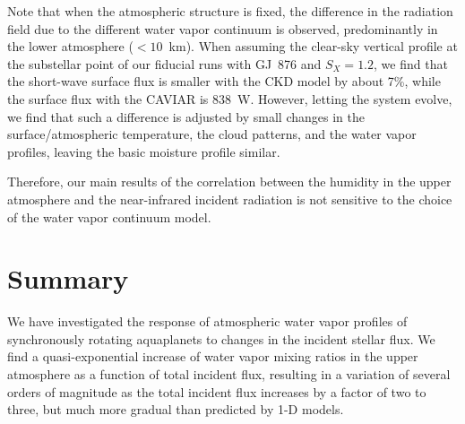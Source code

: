 \documentclass[11pt,numberedappendix,twocolappendix,]{emulateapj}
\def\wv{water vapor}
\begin{document}
{Note that when the atmospheric structure is fixed, the difference in the radiation field due to the different water vapor continuum is observed, predominantly in the lower atmosphere ($<10 $~km). 
When assuming the clear-sky vertical profile at the substellar point of our fiducial runs with GJ~876 and $S_X=1.2$, we find that the short-wave surface flux is smaller with the CKD model by about 7\%, while the surface flux with the CAVIAR is 838~W. 
However, letting the system evolve, we find that such a difference is  adjusted by small changes in the surface/atmospheric temperature, the cloud patterns, and the water vapor profiles, leaving the basic moisture profile  similar. 

Therefore, our main results of the correlation between the humidity in the upper atmosphere and the near-infrared incident radiation is not sensitive to the choice of the water vapor continuum model. 


%


}






\section{Summary}
\label{s:summary}

We have investigated the response of atmospheric \wv{} profiles of synchronously rotating aquaplanets to changes in the incident stellar flux. 
We find a quasi-exponential increase of \wv{} mixing ratios in the upper atmosphere as a function of total incident flux, resulting in a variation of several orders of magnitude as the total incident flux increases by a factor of two to three,  but much more gradual than predicted by 1-D models. 
\end{document}

